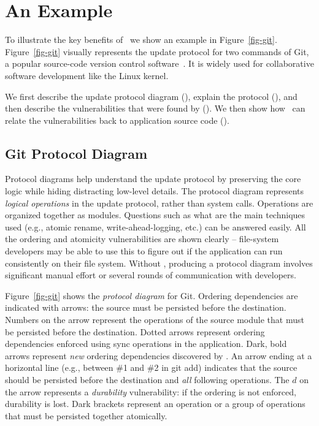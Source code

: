 \section{An Example}
\label{sec-example}

To illustrate the key benefits of \toolname\, we show an example in
Figure~\ref{fig-git}. Figure~\ref{fig-git} visually represents the update protocol for two
commands of Git, a popular source-code version control software~\cite{git}. It
is widely used for collaborative software development like the Linux kernel. 

We first describe the update protocol diagram (),
explain the protocol (), and then describe the
vulnerabilities that were found by \toolname (). We then show
how \toolname\ can relate the vulnerabilities back to application source code
().  

\subsection{Git Protocol Diagram}
\label{sec-protocol-diagram}


Protocol diagrams help understand the update protocol by preserving the core
logic while hiding distracting low-level details. The protocol diagram
represents \textit{logical operations} in the update protocol, rather than
system calls. Operations are organized together as modules. Questions such as
what are the main techniques used (e.g., atomic rename, write-ahead-logging,
etc.) can be answered easily. All the ordering and atomicity vulnerabilities
are shown clearly -- file-system developers may be able to use this to figure
out if the application can run consistently on their file system. Without
\toolname, producing a protocol diagram involves significant manual effort or
several rounds of communication with developers.    

Figure~\ref{fig-git} shows the \textit{protocol diagram} for Git.  Ordering
dependencies are indicated with arrows: the source must be persisted before the
destination. Numbers on the arrow represent the operations of the source module
that must be persisted before the destination.  Dotted arrows represent
ordering dependencies enforced using sync operations in the application. Dark,
bold arrows represent \textit{new} ordering dependencies discovered by
\toolname. An arrow ending at a horizontal line (e.g., between \#1 and \#2 in
git add) indicates that the source should be persisted before the destination
and \textit{all} following operations. The $d$ on the arrow represents a
\textit{durability} vulnerability: if the ordering is not enforced, durability
is lost.  Dark brackets represent an operation or a group of operations that
must be persisted together atomically.  

